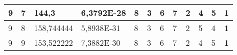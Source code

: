 \documentclass[conference]{IEEEtran}
\begin{document}
\begin{table*}[]
\begin{tabular}{|llll|llllllll|}
\multicolumn{1}{|l|}{9}                                                     & \multicolumn{1}{l|}{7}                                                        & \multicolumn{1}{l|}{144,3}                                                        & 6,3792E-28                     & \multicolumn{1}{l|}{8}                                                  & \multicolumn{1}{l|}{3}                                                  & \multicolumn{1}{l|}{6}                                                  & \multicolumn{1}{l|}{7}                                                  & \multicolumn{1}{l|}{2}                                                  & \multicolumn{1}{l|}{4}                                                  & \multicolumn{1}{l|}{5}                                                  & \textbf{1}                 \\ \hline
\multicolumn{1}{|l|}{9}                                                     & \multicolumn{1}{l|}{8}                                                        & \multicolumn{1}{l|}{158,744444}                                                   & 5,8938E-31                     & \multicolumn{1}{l|}{8}                                                  & \multicolumn{1}{l|}{3}                                                  & \multicolumn{1}{l|}{6}                                                  & \multicolumn{1}{l|}{7}                                                  & \multicolumn{1}{l|}{2}                                                  & \multicolumn{1}{l|}{5}                                                  & \multicolumn{1}{l|}{4}                                                  & \textbf{1}                 \\ \hline
\multicolumn{1}{|l|}{9}                                                     & \multicolumn{1}{l|}{9}                                                        & \multicolumn{1}{l|}{153,522222}                                                   & 7,3882E-30                     & \multicolumn{1}{l|}{8}                                                  & \multicolumn{1}{l|}{3}                                                  & \multicolumn{1}{l|}{6}                                                  & \multicolumn{1}{l|}{7}                                                  & \multicolumn{1}{l|}{2}                                                  & \multicolumn{1}{l|}{4}                                                  & \multicolumn{1}{l|}{5}                                                  & \textbf{1}                 \\ \hline

\end{tabular}
\end{table*}
\end{document}
